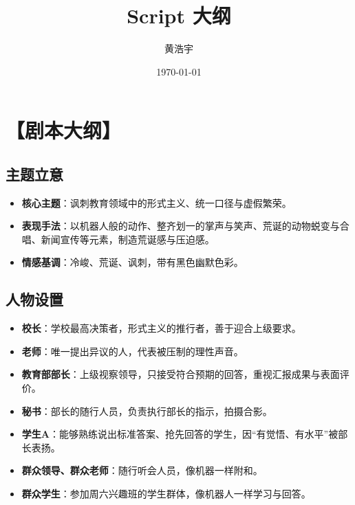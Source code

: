 \documentclass[11pt, a4paper]{article}
\title{Script 大纲}
\author{黄浩宇}
\date{\today}
\begin{document}
        \maketitle
        \newpage
        \tableofcontents

        \newpage

        \section{【剧本大纲】}

        \subsection{主题立意}
        \begin{itemize}[leftmargin=2em, itemsep=0.2em]
                \item \textbf{核心主题}：讽刺教育领域中的形式主义、统一口径与虚假繁荣。
                \item \textbf{表现手法}：以机器人般的动作、整齐划一的掌声与笑声、荒诞的动物蜕变与合唱、新闻宣传等元素，制造荒诞感与压迫感。
                \item \textbf{情感基调}：冷峻、荒诞、讽刺，带有黑色幽默色彩。
        \end{itemize}

        \subsection{人物设置}
        \begin{itemize}[leftmargin=2em, itemsep=0.2em]
                \item \textbf{校长}：学校最高决策者，形式主义的推行者，善于迎合上级要求。
                \item \textbf{老师}：唯一提出异议的人，代表被压制的理性声音。
                \item \textbf{教育部部长}：上级视察领导，只接受符合预期的回答，重视汇报成果与表面评价。
                \item \textbf{秘书}：部长的随行人员，负责执行部长的指示，拍摄合影。
                \item \textbf{学生A}：能够熟练说出标准答案、抢先回答的学生，因“有觉悟、有水平”被部长表扬。
                \item \textbf{群众领导、群众老师}：随行听会人员，像机器一样附和。
                \item \textbf{群众学生}：参加周六兴趣班的学生群体，像机器人一样学习与回答。
        \end{itemize}
\end{document}
